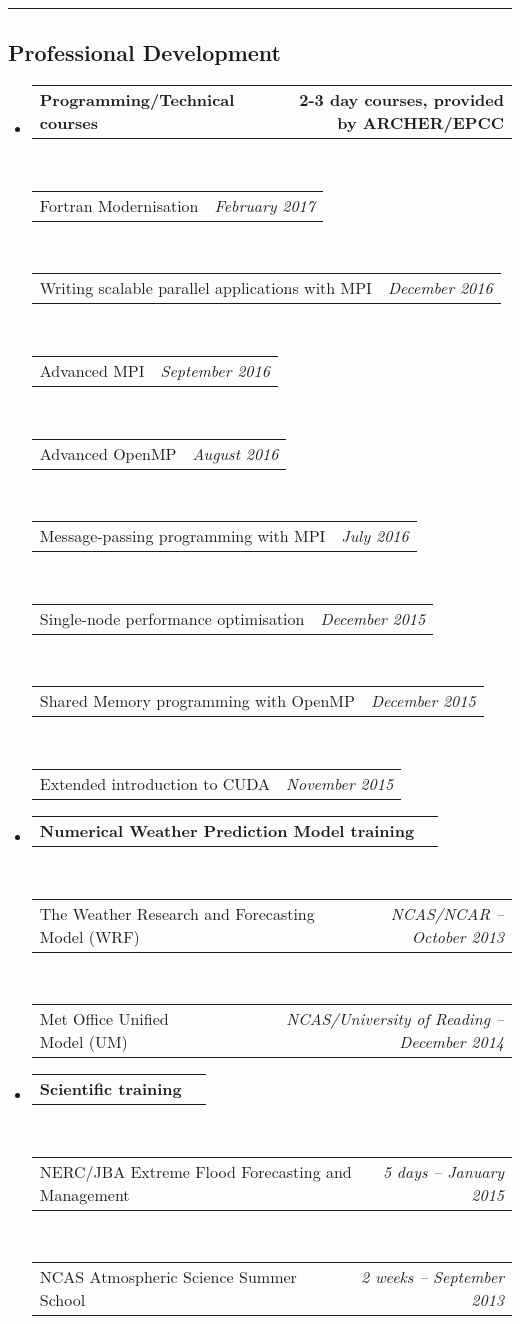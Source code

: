 \documentclass[10.5pt,a4]{article}
\makeatletter
\newcommand{\headerrow}[2]
{\begin{tabular*}{\linewidth}{l@{\extracolsep{\fill}}r}
	#1 &
	#2 \\
\end{tabular*}}
\makeatother
\begin{document}
\hrule
\vspace{-0.4em}
\subsection*{Professional Development}
\begin{itemize}
	\item 
	\headerrow
		{\textbf{Programming/Technical courses}}
		{\textbf{2-3 day courses, provided by ARCHER/EPCC}}
	\\
		\headerrow
		{Fortran Modernisation}
		{\emph{February 2017}}
	\\
	\headerrow
		{Writing scalable parallel applications with MPI}
		{\emph{December 2016}}
	\\
	\headerrow
		{Advanced MPI}
		{\emph{September 2016}}
		\\
	\headerrow
		{Advanced OpenMP}
		{\emph{August 2016}}
	\\
	\headerrow
		{Message-passing programming with MPI}
		{\emph{July 2016}}
	\\
	\headerrow
		{Single-node performance optimisation}
		{\emph{December 2015}}
	\\
	\headerrow
		{Shared Memory programming with OpenMP}
		{\emph{December 2015}}
	\\
	\headerrow
		{Extended introduction to CUDA}
		{\emph{November 2015}}
\end{itemize}

\begin{itemize}
	\item 
	\headerrow
		{\textbf{Numerical Weather Prediction Model training}}
		{}
	\\
		\headerrow
		{The Weather Research and Forecasting Model (WRF)} 
		{\textit{NCAS/NCAR -- October 2013}}
  \\
		\headerrow
		{Met Office Unified Model (UM)}
		{\textit{NCAS/University of Reading -- December 2014}}
\end{itemize}

\begin{itemize}
	\item 
	\headerrow
		{\textbf{Scientific training}}
		{}
	\\
		\headerrow
		{NERC/JBA Extreme Flood Forecasting and Management}
		{\emph{5 days -- January 2015}}
	\\
		\headerrow
		{NCAS Atmospheric Science Summer School}
		{\emph{2 weeks -- September 2013}}

\end{itemize}
\end{document}
